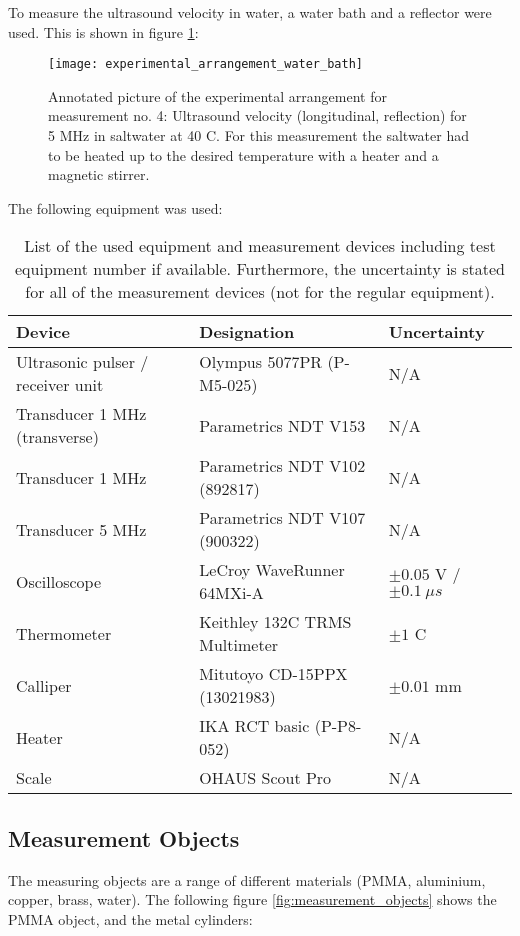 \newpage
To measure the ultrasound velocity in water, a water bath and a reflector were used. This is shown in figure \ref{fig:experimental_arrangement_water_bath}:

\begin{figure}[H]
	\centering
	\texttt{[image: experimental\_arrangement\_water\_bath]}
	\caption{Annotated picture of the experimental arrangement for measurement no. 4: Ultrasound velocity (longitudinal, reflection) for 5 MHz in saltwater at 40 \textdegree C. For this measurement the saltwater had to be heated up to the desired temperature with a heater and a magnetic stirrer.}
	\label{fig:experimental_arrangement_water_bath}
\end{figure}

The following equipment was used:

\begin{table}[H]
	\centering
	\renewcommand{\arraystretch}{1.2}
	\begin{tabular}{l l l}
		\hline
		\textbf{Device} & \textbf{Designation} & \textbf{Uncertainty} \\
		\hline
		Ultrasonic pulser / receiver unit & Olympus 5077PR (P-M5-025) & N/A \\
		Transducer 1 MHz (transverse) & Parametrics NDT V153 & N/A \\
		Transducer 1 MHz & Parametrics NDT V102 (892817) & N/A \\
		Transducer 5 MHz & Parametrics NDT V107 (900322) & N/A \\
		Oscilloscope & LeCroy WaveRunner 64MXi-A & $\pm0.05$ V / $\pm0.1\ \si{\mu s}$ \\
		Thermometer & Keithley 132C TRMS Multimeter & $\pm1$ \textdegree C \\
		Calliper & Mitutoyo CD-15PPX (13021983) & $\pm0.01$ mm \\
		Heater & IKA RCT basic (P-P8-052) & N/A \\
		Scale & OHAUS Scout Pro & N/A \\ \hline
	\end{tabular}
	\caption{List of the used equipment and measurement devices including test equipment number if available. Furthermore, the uncertainty is stated for all of the measurement devices (not for the regular equipment).}
	\label{tab:equipment}
\end{table}

\newpage
\subsection{Measurement Objects}
\label{subsec:measurement_objects}
The measuring objects are a range of different materials (PMMA, aluminium, copper, brass, water). The following figure \ref{fig:measurement_objects} shows the PMMA object, and the metal cylinders:

